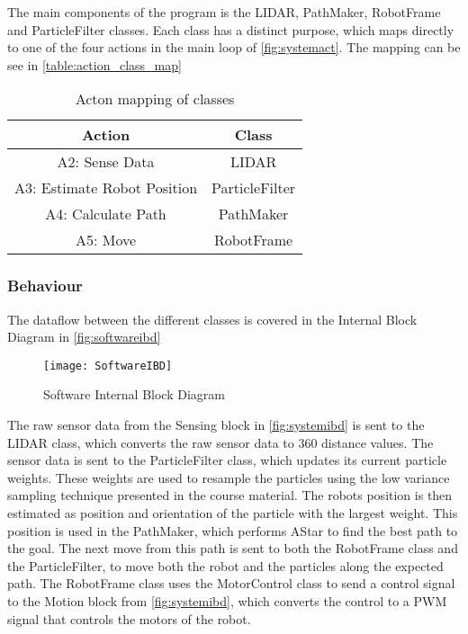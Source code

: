 \documentclass[Main]{subfiles}
\begin{document}
		The main components of the program is the LIDAR, PathMaker, RobotFrame and ParticleFilter classes. 
		Each class has a distinct purpose, which maps directly to one of the four  actions in the main loop of \autoref{fig:systemact}.
		The mapping can be see in \autoref{table:action_class_map}
		 
		\begin{table}[H]
			\centering
			\begin{tabular}{|c|c|}
			\hline
				Action & Class \\ 
			\hline
				A2: Sense Data & LIDAR  \\ 
			\hline
				A3: Estimate Robot Position & ParticleFilter  \\ 
			\hline
				A4: Calculate Path & PathMaker  \\ 
			\hline
				A5: Move & RobotFrame  \\ 
			\hline
			\end{tabular}
			\caption{Acton mapping of classes}
			\label{table:action_class_map} 
		\end{table} \noindent
		
	\subsubsection{Behaviour} %
	\label{subsub:software_behaviour}

		The dataflow between the different classes is covered in the Internal Block Diagram in \autoref{fig:softwareibd}
		
		\begin{figure}[H]
			\centering
			\texttt{[image: SoftwareIBD]}
			\caption{Software Internal Block Diagram}
			\label{fig:softwareibd}
		\end{figure}

		The raw sensor data from the Sensing block in \autoref{fig:systemibd} is sent to the LIDAR class, which  converts the raw sensor data to 360 distance values.
		The sensor data is sent to the ParticleFilter class, which updates its current particle weights. 
		These weights are used to resample the particles using the low variance sampling technique presented in the course material.
		The robots position is then estimated as position and orientation of the particle with the largest weight.
		This position is used in the PathMaker, which performs AStar to find the best path to the goal. 
		The next move from this path is sent to both the RobotFrame class and the ParticleFilter, to move both the robot and the particles along the expected path.
		The RobotFrame class uses the MotorControl class to send a control signal to the Motion block from \autoref{fig:systemibd}, which converts the control to a PWM signal that controls the motors of the robot.
		
\end{document}

